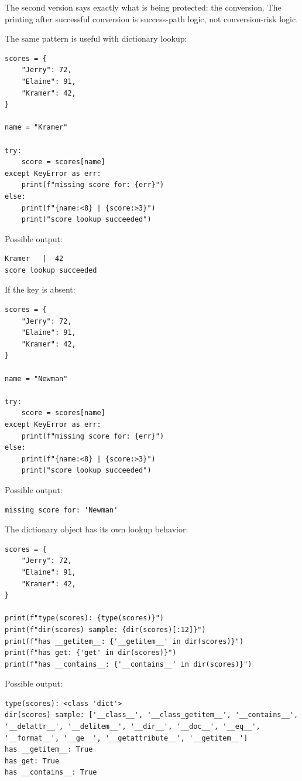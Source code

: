 The second version says exactly what is being protected: the conversion. The printing after successful conversion is success-path logic, not conversion-risk logic.

The same pattern is useful with dictionary lookup:

\begin{verbatim}
scores = {
    "Jerry": 72,
    "Elaine": 91,
    "Kramer": 42,
}

name = "Kramer"

try:
    score = scores[name]
except KeyError as err:
    print(f"missing score for: {err}")
else:
    print(f"{name:<8} | {score:>3}")
    print("score lookup succeeded")
\end{verbatim}

Possible output:

\begin{verbatim}
Kramer   |  42
score lookup succeeded
\end{verbatim}

If the key is absent:

\begin{verbatim}
scores = {
    "Jerry": 72,
    "Elaine": 91,
    "Kramer": 42,
}

name = "Newman"

try:
    score = scores[name]
except KeyError as err:
    print(f"missing score for: {err}")
else:
    print(f"{name:<8} | {score:>3}")
    print("score lookup succeeded")
\end{verbatim}

Possible output:

\begin{verbatim}
missing score for: 'Newman'
\end{verbatim}

The dictionary object has its own lookup behavior:

\begin{verbatim}
scores = {
    "Jerry": 72,
    "Elaine": 91,
    "Kramer": 42,
}

print(f"type(scores): {type(scores)}")
print(f"dir(scores) sample: {dir(scores)[:12]}")
print(f"has __getitem__: {'__getitem__' in dir(scores)}")
print(f"has get: {'get' in dir(scores)}")
print(f"has __contains__: {'__contains__' in dir(scores)}")
\end{verbatim}

Possible output:

\begin{verbatim}
type(scores): <class 'dict'>
dir(scores) sample: ['__class__', '__class_getitem__', '__contains__',
'__delattr__', '__delitem__', '__dir__', '__doc__', '__eq__',
'__format__', '__ge__', '__getattribute__', '__getitem__']
has __getitem__: True
has get: True
has __contains__: True
\end{verbatim}


